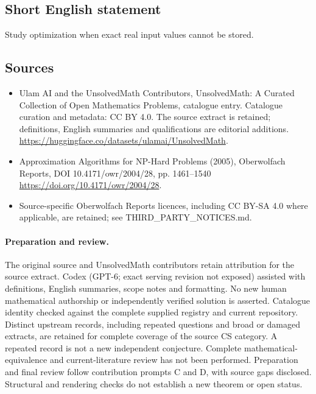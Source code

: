 \documentclass[11pt]{article}
\begin{document}
\subsection{Short English statement}
Study optimization when exact real input values cannot be stored.
\subsection{Sources}
\begin{itemize}
\item[\hypertarget{source:statement:1}{S1}] Ulam AI and the UnsolvedMath Contributors, UnsolvedMath: A Curated Collection of Open Mathematics Problems, catalogue entry. Catalogue curation and metadata: CC BY 4.0. The source extract is retained; definitions, English summaries and qualifications are editorial additions.
\url{https://huggingface.co/datasets/ulamai/UnsolvedMath}.
\item[\hypertarget{source:statement:2}{S2}] Approximation Algorithms for NP-Hard Problems (2005), Oberwolfach Reports, DOI 10.4171/owr/2004/28, pp. 1461--1540
\url{https://doi.org/10.4171/owr/2004/28}.
\item Source-specific Oberwolfach Reports licences, including CC BY-SA 4.0 where applicable, are retained; see THIRD\_PARTY\_NOTICES.md.
\end{itemize}
\paragraph{Preparation and review.}
The original source and UnsolvedMath contributors retain attribution for the source extract. Codex (GPT-6; exact serving revision not exposed) assisted with definitions, English summaries, scope notes and formatting. No new human mathematical authorship or independently verified solution is asserted. Catalogue identity checked against the complete supplied registry and current repository. Distinct upstream records, including repeated questions and broad or damaged extracts, are retained for complete coverage of the source CS category. A repeated record is not a new independent conjecture. Complete mathematical-equivalence and current-literature review has not been performed. Preparation and final review follow contribution prompts C and D, with source gaps disclosed. Structural and rendering checks do not establish a new theorem or open status.
\label{end:statement}
\end{document}
